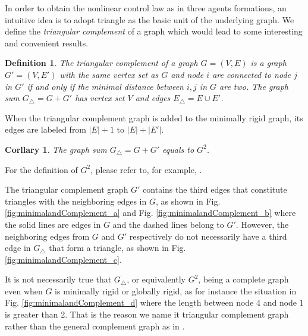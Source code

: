 \documentclass[times]{rncauth}
\newtheorem{cor}{Corllary}[section]
\newtheorem{defn}{Definition}[section]
\begin{document}
In order to obtain the nonlinear control law as in three agents
formations, an intuitive idea is to  adopt triangle as the basic
unit of the underlying graph. We define the \emph{triangular
complement} of a graph which would lead to some interesting and
convenient results.
\begin{defn}
  The \emph{triangular complement} of a graph $G=(V,E)$ is a graph $G'=(V,E')$
  with the same
  vertex set as $G$ and node $i$ are connected to node $j$ in $G'$ if and only if
  the minimal distance between $i,j$ in $G$ are two.
   The graph sum $G_\triangle=G+G'$
  has vertex set $V$ and edges $E_\triangle=E\cup E'$.
\end{defn}
\begin{rm}
  When the triangular complement graph is added to the minimally rigid
graph, its edges are labeled from $|E|+1$ to $|E|+|E'|$.
\end{rm}
\begin{cor}
  The graph sum $G_\triangle=G+G'$ equals to
  $G^2$.
\end{cor}
For the definition of $G^2$, please refer to, for example,
\cite{Diestel10,Anderson09easilyLocalizable}.

 The
triangular complement graph $G'$ contains the third edges that
constitute triangles with the neighboring edges in $G$, as shown in
 Fig. \ref{fig:minimalandComplement_a} and Fig.
\ref{fig:minimalandComplement_b} where the solid lines are edges in
$G$ and the dashed lines belong to $G'$. However, the neighboring
edges from $G$ and $G'$ respectively do not
  necessarily have a third edge in $G_\triangle$ that form a
  triangle, as shown in Fig. \ref{fig:minimalandComplement_c}.




It is not necessarily true that $G_\triangle$, or equivalently
$G^2$, being a complete graph even when $G$ is minimally rigid or
globally rigid, as for instance the situation in Fig.
\ref{fig:minimalandComplement_d} where the length between node 4 and
node 1 is greater than 2. That is the reason we name it triangular
complement graph rather than the general complement graph as in
\cite{Diestel10}.
\end{document}
